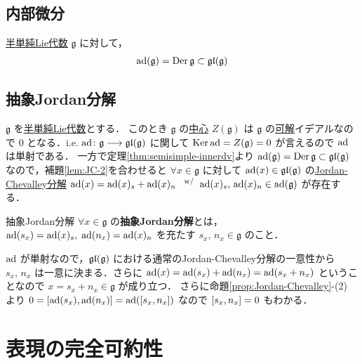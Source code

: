 \documentclass[rep_main]{subfiles}
\begin{document}
\subsection{内部微分}

\begin{mytheo}[label=thm:semisimple-innerdv]{}
	\hyperref[def:semisimple-LieAlg]{半単純Lie代数} $\mathfrak{g}$ に対して，
	\begin{align}
		\operatorname{ad}(\mathfrak{g}) = \operatorname{Der} \mathfrak{g} \subset \mathfrak{gl}(\mathfrak{g})
	\end{align}
\end{mytheo}


\subsection{抽象Jordan分解}

$\mathfrak{g}$ を\hyperref[def:semisimple-LieAlg]{半単純Lie代数}とする．
このとき $\mathfrak{g}$ の\hyperref[def:center-LieAlg]{中心} $Z(\mathfrak{g})$ は $\mathfrak{g}$ の\hyperref[def:solvable-LieAlg]{可解}イデアルなので $0$ となる．i.e. $\operatorname{ad} \colon \mathfrak{g} \longrightarrow \mathfrak{gl} (\mathfrak{g})$ に関して $\operatorname{Ker} \operatorname{ad} = Z(\mathfrak{g}) = 0$ が言えるので $\operatorname{ad}$ は単射である．
一方で定理\ref{thm:semisimple-innerdv}より $\operatorname{ad} (\mathfrak{g}) = \operatorname{Der} \mathfrak{g} \subset \mathfrak{gl} (\mathfrak{g})$ なので，補題\ref{lem:JC-2}を合わせると
$\forall x \in \mathfrak{g}$ に対して $\operatorname{ad}(x) \in \mathfrak{gl}(\mathfrak{g})$ の\hyperref[prop:Jordan-Chevalley]{Jordan-Chevalley分解}
$\operatorname{ad}(x) = \operatorname{ad}(x)_s + \operatorname{ad}(x)_n\;\mathrel{} {}^{\mathrm{w}/} \mathrel{} \operatorname{ad}(x)_s,\, \operatorname{ad}(x)_n \in \operatorname{ad}(\mathfrak{g})$ が存在する．

\begin{mydef}[label=def:abstruct-JC]{抽象Jordan分解}
	$\forall x \in \mathfrak{g}$ の\textbf{抽象Jordan分解}とは，
	$\operatorname{ad}(s_x) = \operatorname{ad}(x)_s,\; \operatorname{ad}(n_x) = \operatorname{ad}(x)_n$ を充たす $s_x,\, n_x \in \mathfrak{g}$ のこと．
\end{mydef}

$\operatorname{ad}$ が単射なので，$\mathfrak{gl}(\mathfrak{g})$ における通常のJordan-Chevalley分解の一意性から $s_x,\, n_x$ は一意に決まる．さらに $\operatorname{ad}(x) = \operatorname{ad}(s_x) + \operatorname{ad}(n_x) = \operatorname{ad}(s_x+n_x)$ ということなので $x = s_x + n_x \in \mathfrak{g}$ が成り立つ．
さらに命題\ref{prop:Jordan-Chevalley}-(2) より $0 = \comm{\ad(s_x)}{\ad(n_x)} = \ad(\comm{s_x}{n_x})$ なので $\comm{s_x}{n_x} = 0$ もわかる．

\section{表現の完全可約性}
\end{document}
